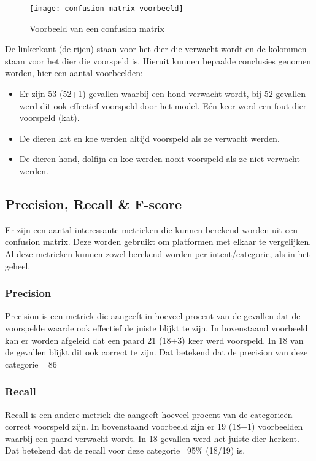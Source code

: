 \begin{figure}[H]
    \label{fig:confusion-matrix-voorbeeld}
    \centering
    \texttt{[image: confusion-matrix-voorbeeld]}
    \caption{Voorbeeld van een confusion matrix}
\end{figure}

De linkerkant (de rijen) staan voor het dier die verwacht wordt en de kolommen staan voor het dier die voorspeld is. Hieruit kunnen bepaalde conclusies genomen worden, hier een aantal voorbeelden:
\begin{itemize}
    \item Er zijn 53 (52+1) gevallen waarbij een hond verwacht wordt, bij 52 gevallen werd dit ook effectief voorspeld door het model. Eén keer werd een fout dier voorspeld (kat).
    \item De dieren kat en koe werden altijd voorspeld als ze verwacht werden.
    \item De dieren hond, dolfijn en koe werden nooit voorspeld als ze niet verwacht werden.
\end{itemize}

\subsection{Precision, Recall \& F-score}
\label{subsec:validatie-precision-recall-f-score}

Er zijn een aantal interessante metrieken die kunnen berekend worden uit een confusion matrix. Deze worden gebruikt om platformen met elkaar te vergelijken. Al deze metrieken kunnen zowel berekend worden per intent/categorie, als in het geheel.

\subsubsection{Precision}

Precision is een metriek die aangeeft in hoeveel procent van de gevallen dat de voorspelde waarde ook effectief de juiste blijkt te zijn.
In bovenstaand voorbeeld kan er worden afgeleid dat een paard 21 (18+3) keer werd voorspeld. In 18 van de gevallen blijkt dit ook correct te zijn. Dat betekend dat de precision van deze categorie ~ 86%

\subsubsection{Recall}

Recall is een andere metriek die aangeeft hoeveel procent van de categorieën correct voorspeld zijn. In bovenstaand voorbeeld zijn er 19 (18+1) voorbeelden waarbij een paard verwacht wordt. In 18 gevallen werd het juiste dier herkent. Dat betekend dat de recall voor deze categorie~ 95\% (18/19) is.

